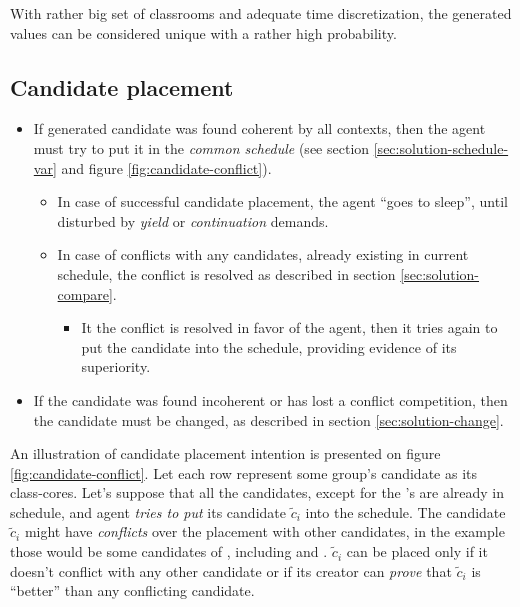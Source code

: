 \documentclass[../../ThesisDoc]{subfiles}
\begin{document}
\begin{note}
  With rather big set of classrooms and adequate time discretization, the generated
  values can be considered unique with a rather high probability.
\end{note}



\subsection{Candidate placement}
\begin{itemize}
  \item If generated candidate was found coherent by all contexts,
        then the agent must try to put it in the \emph{common schedule}
        (see section \ref{sec:solution-schedule-var} and figure \ref{fig:candidate-conflict}).
        \begin{itemize}
          \item In case of successful candidate placement, the agent ``goes to sleep'',
                until disturbed by \emph{yield} or \emph{continuation} demands.
          \item In case of conflicts with any candidates, already existing
                in current schedule, the conflict is resolved as described
                in section \ref{sec:solution-compare}.
                \begin{itemize}
                  \item It the conflict is resolved in favor of the agent,
                        then it tries again to put the candidate into the
                        schedule, providing evidence of its superiority.
                \end{itemize}
        \end{itemize}
  \item If the candidate was found incoherent or has lost a conflict competition,
        then the candidate must be changed, as described in section
        \ref{sec:solution-change}.
\end{itemize}

An illustration of candidate placement intention is presented on figure
\ref{fig:candidate-conflict}.
Let each row represent some group's candidate as its class-cores.
Let's suppose that all the candidates, except for the 's
are already in schedule, and agent  \emph{tries to put}
its candidate $\tilde{c}_i$ into the schedule.
The candidate $\tilde{c}_i$ might have \emph{conflicts} over the
placement with other candidates, in the example those would be
some candidates of , including  and
. $\tilde{c}_i$ can be placed only if it doesn't conflict
with any other candidate or if its creator can \emph{prove} that
$\tilde{c}_i$ is ``better'' than any conflicting candidate.
\end{document}
